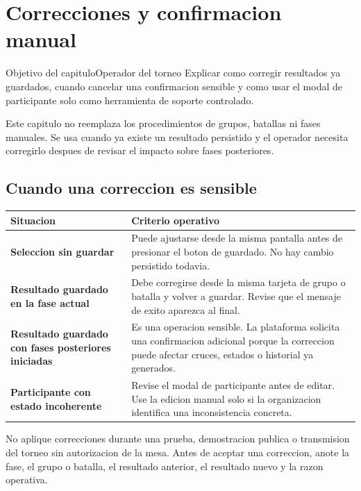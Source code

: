 \chapter{Correcciones y confirmacion manual}
\label{cap:correcciones-manuales}

\begin{procedimiento}{Objetivo del capitulo}{Operador del torneo}
Explicar como corregir resultados ya guardados, cuando cancelar una confirmacion sensible y como usar el modal de participante solo como herramienta de soporte controlado.
\end{procedimiento}

Este capitulo no reemplaza los procedimientos de grupos, batallas ni fases manuales. Se usa cuando ya existe un resultado persistido y el operador necesita corregirlo despues de revisar el impacto sobre fases posteriores.

\section{Cuando una correccion es sensible}

\begin{tabularx}{\linewidth}{>{\bfseries}p{3.8cm}X}
\toprule
Situacion & Criterio operativo\\
\midrule
Seleccion sin guardar & Puede ajustarse desde la misma pantalla antes de presionar el boton de guardado. No hay cambio persistido todavia.\\
Resultado guardado en la fase actual & Debe corregirse desde la misma tarjeta de grupo o batalla y volver a guardar. Revise que el mensaje de exito aparezca al final.\\
Resultado guardado con fases posteriores iniciadas & Es una operacion sensible. La plataforma solicita una confirmacion adicional porque la correccion puede afectar cruces, estados o historial ya generados.\\
Participante con estado incoherente & Revise el modal de participante antes de editar. Use la edicion manual solo si la organizacion identifica una inconsistencia concreta.\\
\bottomrule
\end{tabularx}

\begin{operacionsensible}
No aplique correcciones durante una prueba, demostracion publica o transmision del torneo sin autorizacion de la mesa. Antes de aceptar una correccion, anote la fase, el grupo o batalla, el resultado anterior, el resultado nuevo y la razon operativa.
\end{operacionsensible}

